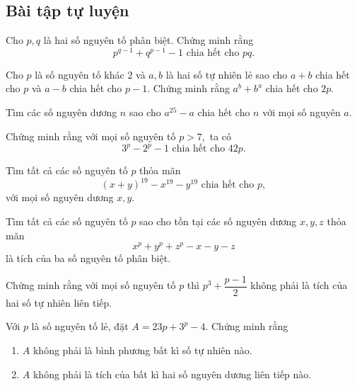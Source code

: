 \subsection{Bài tập tự luyện}

\begin{btt}
Cho $p, q$ là hai số nguyên tố phân biệt. Chứng minh rằng 
\[p^{q-1}+q^{p-1}-1\text{ chia hết cho }pq.\]
\end{btt}

\begin{btt}
Cho $p$ là số nguyên tố khác $2$ và $a, b$ là hai số tự nhiên lẻ sao cho $a+b$ chia hết cho $p$ và $a-b$ chia hết cho $p-1$. Chứng minh rằng $a^{b}+b^{a}$ chia hết cho $2p.$
\end{btt}

\begin{btt}
Tìm các số nguyên dương $n$ sao cho $a^{25}-a$ chia hết cho $n$ với mọi số nguyên $a.$
\end{btt}

\begin{btt}
Chứng minh rằng với mọi số nguyên tố $p>7,$ ta có
\[3^{p}-2^{p}-1\text{ chia hết cho }42p.\]
\end{btt}

\begin{btt}
Tìm tất cả các số nguyên tố \(p\) thỏa mãn
\[(x+y)^{19}-x^{19}-y^{19}\text{ chia hết cho }p,\]
với mọi số nguyên dương $x,y.$
\end{btt}

\begin{btt}
Tìm tất cả các số nguyên tố \(p\) sao cho tồn tại các số nguyên dương \(x,y,z\) thỏa mãn
    $$x^{p}+y^{p}+z^{p}-x-y-z$$
là tích của ba số nguyên tố phân biệt.
\end{btt}

\begin{btt}
Chứng minh rằng với mọi số nguyên tố $p$ thì $p^3+\dfrac{p-1}{2}$ không phải là tích của hai số tự nhiên liên tiếp.
\end{btt}

\begin{btt}
Với $p$ là số nguyên tố lẻ, đặt $A=23 p+3^{p} - 4.$ Chứng minh rằng
\begin{enumerate}[a,]
    \item $A$ không phải là bình phương bất kì số tự nhiên nào.
    \item $A$ không phải là tích của bất kì hai số nguyên dương liên tiếp nào.
\end{enumerate}
\end{btt}

